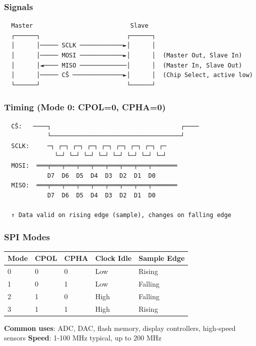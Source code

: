 \documentclass[11pt,a4paper]{book}
\begin{document}
\begin{itemize}
\subsubsection{Signals}

\begin{lstlisting}
  Master                           Slave
  ┌──────┐                        ┌──────┐
  │      │───── SCLK ────────────►│      │
  │      │───── MOSI ────────────►│      │  (Master Out, Slave In)
  │      │◄──── MISO ─────────────│      │  (Master In, Slave Out)
  │      │───── CS̄ ──────────────►│      │  (Chip Select, active low)
  └──────┘                        └──────┘
\end{lstlisting}

\subsubsection{Timing (Mode 0: CPOL=0, CPHA=0)}

\begin{lstlisting}
  CS̄:   ────┐                                    ┌────
            └────────────────────────────────────┘
  SCLK:     ─┐ ┌─┐ ┌─┐ ┌─┐ ┌─┐ ┌─┐ ┌─┐ ┌─┐ ┌─
              └─┘ └─┘ └─┘ └─┘ └─┘ └─┘ └─┘ └─┘
  MOSI:  ═══╤═══╤═══╤═══╤═══╤═══╤═══╤═══╤═══════
            D7  D6  D5  D4  D3  D2  D1  D0
  MISO:  ═══╤═══╤═══╤═══╤═══╤═══╤═══╤═══╤═══════
            D7  D6  D5  D4  D3  D2  D1  D0
  
  ↑ Data valid on rising edge (sample), changes on falling edge
\end{lstlisting}

\subsubsection{SPI Modes}

\begin{center}
\begin{tabular}{|l|l|l|l|l|}
\hline
Mode & CPOL & CPHA & Clock Idle & Sample Edge \\
\hline
0 & 0 & 0 & Low & Rising \\
1 & 0 & 1 & Low & Falling \\
2 & 1 & 0 & High & Falling \\
3 & 1 & 1 & High & Rising \\
\hline
\end{tabular}
\end{center}

\textbf{Common uses}: ADC, DAC, flash memory, display controllers, high-speed sensors
\textbf{Speed}: 1-100 MHz typical, up to 200 MHz


\end{itemize}
\end{document}
